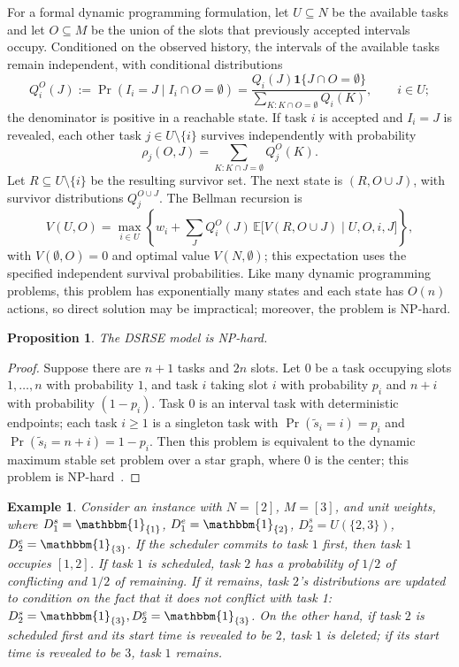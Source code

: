 \documentclass{article}
\newtheorem{example}[theorem]{Example}
\newtheorem{proposition}[theorem]{Proposition}
\newcommand{\E}{\mathbb{E}}
\begin{document}
{For a formal dynamic programming formulation, let $U\subseteq N$ be the available tasks and let $O\subseteq M$ be the union of the slots that previously accepted intervals occupy. Conditioned on the observed history, the intervals of the available tasks remain independent, with conditional distributions
}\[
{Q_i^O(J):=\Pr(I_i=J\mid I_i\cap O=\emptyset)
=\frac{Q_i(J)\mathbf1\{J\cap O=\emptyset\}}{\sum_{K:K\cap O=\emptyset}Q_i(K)},\qquad i\in U;
}\]
the denominator is positive in a reachable state.
If task $i$ is accepted and $I_i=J$ is revealed, each other task $j\in U\setminus\{i\}$ survives independently with probability
\[
\rho_j(O,J)=\sum_{K:K\cap J=\emptyset}Q_j^O(K).
\]
{Let $R\subseteq U\setminus\{i\}$ be the resulting survivor set. The next state is $(R,O\cup J)$, with survivor distributions $Q_j^{O\cup J}$. The Bellman recursion is
}\[
{V(U,O)=\max_{i\in U}\left\{w_i+
\sum_J Q_i^O(J)\,\E\bigl[V(R,O\cup J)\mid U,O,i,J\bigr]\right\},
}\]
{with $V(\emptyset,O)=0$ and optimal value $V(N,\emptyset)$; this expectation uses the specified independent survival probabilities}. Like many dynamic programming problems, this problem has exponentially many states and each state has $O(n)$ actions, so  {direct solution may be impractical}; moreover, the problem is NP-hard.
\begin{proposition}\label{prop:NP-hard}
     The DSRSE model is NP-hard.
\end{proposition}
\begin{proof}
    Suppose there are $n+1$ tasks and $2n$ slots.
    Let $0$ be a task occupying {slots} $1,\ldots,n$ with probability $1$, and task $i$ taking {slot} $i$ with probability $p_i$ and $n+i$ with probability $(1-p_i)$.
    {Task $0$ is an interval task with deterministic endpoints; each task $i\geq1$ is a singleton task with $\Pr(\widetilde s_i=i)=p_i$ and $\Pr(\widetilde s_i=n+i)=1-p_i$.}
    Then this problem is equivalent to the dynamic maximum stable set problem over a star graph, where $0$ is the center;
    this problem is NP-hard~\cite{DNP}.
\end{proof}
\begin{example}
\label{eg:1}
Consider an instance with $N=[2]$, $M=[3]$, and unit weights, where $D_1^s=\mathbbm{1}_{\{1\}}$, $D_1^e=\mathbbm{1}_{\{2\}}$, $D_2^s=U(\{2,3\})$, $D_2^e=\mathbbm{1}_{\{3\}}$. If the scheduler commits to task $1$ first, then task $1$ occupies $[1,2]$. If task $1$ is scheduled, task $2$ has a probability of $1/2$ of conflicting and $1/2$ of remaining. If it remains, task $2$'s distributions are updated to condition on the fact that it does not conflict with task 1: $D_2^s=\mathbbm{1}_{\{3\}},D_2^e=\mathbbm{1}_{\{3\}}$.
On the other hand, if task $2$ is scheduled first and its start time {is revealed to be} $2$, task $1$ is deleted; if {its start time is revealed to be} $3$, task $1$ remains.
\end{example}
\end{document}
